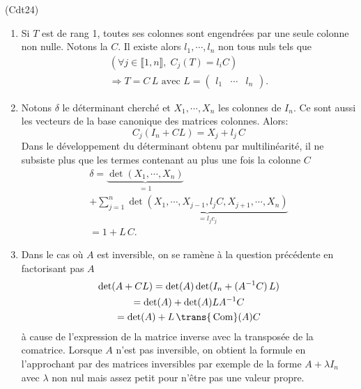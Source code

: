 \begin{tiny}(Cdt24)\end{tiny}
\begin{enumerate}
 \item Si $T$ est de rang 1, toutes ses colonnes sont engendrées par une seule colonne non nulle. Notons la $C$. Il existe alors $l_1, \cdots, l_n$ non tous nuls tels que
 \begin{multline*}
  \left( \forall j \in \llbracket 1,n \rrbracket, \; C_j(T) = l_iC\right) \\ 
  \Rightarrow
  T = C \,L\text{ avec } 
  L =
  \begin{pmatrix}
   l_1 & \cdots & l_n
  \end{pmatrix}.
 \end{multline*}

 \item Notons $\delta$ le déterminant cherché et $X_1, \cdots, X_n$ les colonnes de $I_n$. Ce sont aussi les vecteurs de la base canonique des matrices colonnes. Alors:
 \[
  C_j(I_n + CL) = X_j + l_j\,C
 \]
Dans le développement du déterminant obtenu par multilinéarité, il ne subsiste plus que les termes contenant au plus une fois la colonne $C$
\begin{multline*}
 \delta = \underset{=1}{\underbrace{\det(X_1,\cdots,X_n)}} \\
 + \sum_{j=1}^{n}\underset{ = l_j c_j}{\underbrace{\det(X_1,\cdots,X_{j-1},l_jC,X_{j+1},\cdots,X_n)}}\\
 = 1 + L\,C.
\end{multline*}

 \item Dans le cas où $A$ est inversible, on se ramène à la question précédente en factorisant pas $A$
\begin{multline*}
 \det(A + CL) = \det(A)\det(I_n + (A^{-1}C)\,L)\\
 = \det(A) + \det(A)LA^{-1}C\\
 = \det(A) + L\, \trans{\,\mathop{\mathrm{Com }}}(A) C
\end{multline*}
à cause de l'expression de la matrice inverse avec la transposée de la comatrice.\newline
Lorsque $A$ n'est pas inversible, on obtient la formule en l'approchant par des matrices inversibles par exemple de la forme $A + \lambda I_n$ avec $\lambda$ non nul mais assez petit pour n'être pas une valeur propre.
\end{enumerate}
